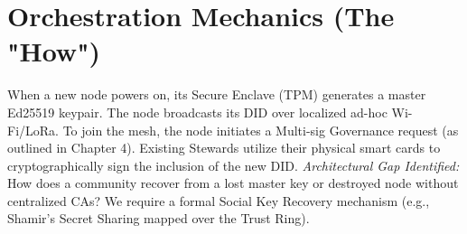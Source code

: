 \section{Orchestration Mechanics (The "How")}
When a new node powers on, its Secure Enclave (TPM) generates a master Ed25519 keypair. The node broadcasts its DID over localized ad-hoc Wi-Fi/LoRa. To join the mesh, the node initiates a Multi-sig Governance request (as outlined in Chapter 4). Existing Stewards utilize their physical smart cards to cryptographically sign the inclusion of the new DID. 
\textit{Architectural Gap Identified:} How does a community recover from a lost master key or destroyed node without centralized CAs? We require a formal Social Key Recovery mechanism (e.g., Shamir's Secret Sharing mapped over the Trust Ring).
